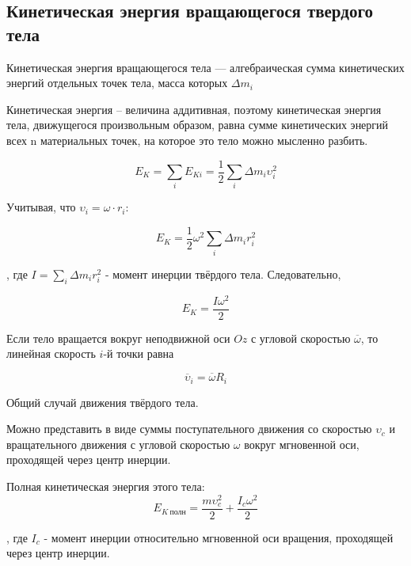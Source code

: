\subsection{Кинетическая энергия вращающегося твердого тела}

\begin{definition}
    Кинетическая энергия вращающегося тела — алгебраическая сумма кинетических энергий отдельных точек тела, 
    масса которых $\Delta m_i$
\end{definition}

\begin{definition}
    Кинетическая энергия – величина аддитивная, поэтому кинетическая энергия тела, движущегося произвольным образом, 
    равна сумме кинетических энергий всех n материальных точек, на которое это тело можно мысленно разбить.
\end{definition}

$$E_K=\sum_iE_{Ki}=\frac{1}{2}\sum_i\Delta m_i\upsilon_i^2$$

Учитывая, что $\upsilon_i=\omega\cdot r_i$:

$$E_K=\frac{1}{2}\omega^2\sum_i\Delta m_ir_i^2$$

, где $I=\sum_i\Delta m_ir_i^2$ - момент инерции твёрдого тела. Следовательно,

$$E_K=\frac{I\omega^2}{2}$$

Если тело вращается вокруг неподвижной оси $Oz$ с угловой скоростью $\overline\omega$, 
то линейная скорость $i$-й точки равна

$$\overline\upsilon_i=\overline\omega R_i$$

\begin{definition}
    Общий случай движения твёрдого тела.

Можно представить в виде суммы поступательного движения со скоростью $\upsilon_c$ и вращательного движения с 
угловой скоростью $\omega$ вокруг мгновенной оси, проходящей через центр инерции.
\end{definition}

Полная кинетическая энергия этого тела:
$$E_{K\ полн}=\frac{m\upsilon^2_c}{2}+\frac{I_c\omega^2}{2}$$

, где $I_c$ - момент инерции относительно мгновенной оси вращения, проходящей через центр инерции.